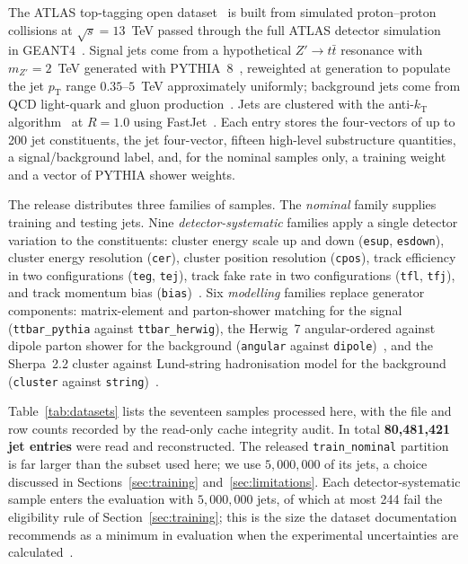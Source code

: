 \documentclass[pdflatex,sn-mathphys,Numbered,iicol]{sn-jnl}
\newcommand{\pt}{p_{\mathrm{T}}}
\begin{document}
The ATLAS top-tagging open dataset~\cite{ATLASOpenData2024} is built from simulated
proton--proton collisions at $\sqrt{s}=13$~TeV passed through the full ATLAS detector
simulation~\cite{ATLASDetector2008} in GEANT4~\cite{Agostinelli2003}. Signal jets come
from a hypothetical $Z' \to t\bar t$ resonance with $m_{Z'} = 2$~TeV generated with
PYTHIA~8~\cite{Sjostrand2015}, reweighted at generation to populate the jet $\pt$ range
$0.35$--$5$~TeV approximately uniformly; background jets come from QCD light-quark and
gluon production~\cite{ATLAS2024}. Jets are clustered with the anti-$k_{\mathrm{T}}$
algorithm~\cite{Cacciari2008anti} at $R = 1.0$ using FastJet~\cite{Cacciari2012fastjet}.
Each entry stores the four-vectors of up to 200 jet constituents, the jet four-vector,
fifteen high-level substructure quantities, a signal/background label, and, for the
nominal samples only, a training weight and a vector of PYTHIA shower weights.

The release distributes three families of samples. The \emph{nominal} family supplies
training and testing jets. Nine \emph{detector-systematic} families apply a single
detector variation to the constituents: cluster energy scale up and down
(\texttt{esup}, \texttt{esdown}), cluster energy resolution (\texttt{cer}), cluster
position resolution (\texttt{cpos}), track efficiency in two configurations
(\texttt{teg}, \texttt{tej}), track fake rate in two configurations (\texttt{tfl},
\texttt{tfj}), and track momentum bias (\texttt{bias})~\cite{ATLAS2024}. Six
\emph{modelling} families replace generator components: matrix-element and
parton-shower matching for the signal (\texttt{ttbar\_pythia} against
\texttt{ttbar\_herwig}), the Herwig~7 angular-ordered against dipole parton shower for
the background (\texttt{angular} against \texttt{dipole})~\cite{Bellm2016}, and the
Sherpa~2.2 cluster against Lund-string hadronisation model for the background
(\texttt{cluster} against \texttt{string})~\cite{Bothmann2019}.

Table~\ref{tab:datasets} lists the seventeen samples processed here, with the file and
row counts recorded by the read-only cache integrity audit. In total
\textbf{80{,}481{,}421 jet entries} were read and reconstructed. The released
\texttt{train\_nominal} partition is far larger than the subset used here; we use
$5{,}000{,}000$ of its jets, a choice discussed in
Sections~\ref{sec:training} and~\ref{sec:limitations}. Each detector-systematic sample
enters the evaluation with $5{,}000{,}000$ jets, of which at most 244 fail the
eligibility rule of Section~\ref{sec:training}; this is the size the dataset
documentation recommends as a minimum in evaluation when the experimental
uncertainties are calculated~\cite{ATLASGitLab}.
\end{document}
